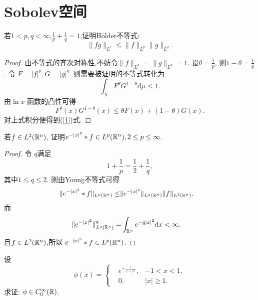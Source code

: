 \section{Sobolev空间}
\begin{exercise}
  若$1<p,q<\infty$,$\frac{1}{p}+\frac{1}{q}=1$,证明H\"{o}lder不等式:
  \[
  \|fg\|_{L^{1}}\le \|f\|_{L^{p}}\|g\|_{L^{q}}.
  \] 
\end{exercise}
\begin{proof}
  由不等式的齐次对称性,不妨令$\|f\|_{L^{p}}=\|g\|_{L^{q}}=1$.
  设$\theta = \frac{1}{p}$, 则$1-\theta = \frac{1}{q}$. 令 $F=|f|^{p},G=|g|^{q}$. 则需要被证明的不等式转化为
  \begin{equation}
    \int_{X}F^{\theta}G^{1-\theta}\mathrm{d}\mu\le 1.\label{1}
\end{equation}
  由$\ln x$ 函数的凸性可得
  \[
    F^{\theta}(x)G^{1-\theta}(x)\le \theta F(x) +(1-\theta) G(x).
  \] 
  对上式积分便得到(\ref{1})式.
\end{proof}
\begin{exercise}
  若$f\in L^2(\mathbb{R}^{n})$, 证明$e^{-|x|^2}*f\in L^{p}(\mathbb{R}^{n}),2\le p\le \infty$.
\end{exercise}
\begin{proof}
  令 $q$满足
   \[
  1+\frac{1}{p}=\frac{1}{2}+\frac{1}{q},
  \]
  其中$1\le q\le 2$.
  则由Young不等式可得
  \begin{equation}
    \begin{aligned}
      \|e^{-|x|^2}*f\|_{L^{p}(\mathbb{R}^{n})}\le & \|e^{-|x|^2}\|_{L^{q}(\mathbb{R}^{n})}\|f\|_{L^{2}(\mathbb{R}^{n})}.
    \end{aligned}
  \end{equation}
  而
  \begin{equation*}
    \begin{aligned}
      \|e^{-|x|^2}\|_{L^{q}(\mathbb{R}^{n})}^{q} = & \int_{\mathbb{R}^{n}}e^{-q|x|^2}\mathrm{d}x<\infty,
    \end{aligned}
  \end{equation*}
  且$f\in L^2(\mathbb{R}^{n})$,所以 $e^{-|x|^2}*f \in L^{p}(\mathbb{R}^{n})$.
\end{proof}
\begin{exercise}
  设
  \begin{equation*}
    \phi(x)=\left\{ \begin{aligned}
      & e^{- \frac{1}{1-x^2}}, & -1<x<1,\\
      & 0, & |x|\ge 1.
    \end{aligned}\right.
  \end{equation*}
  求证: $\phi \in C_0^{\infty}(\mathbb{R})$.
\end{exercise}
